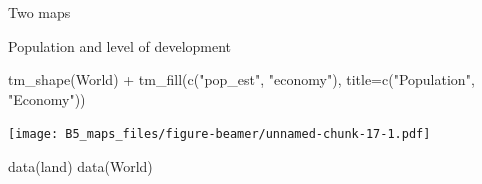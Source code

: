 \documentclass[
  10pt,
  ignorenonframetext,
]{beamer}
\newenvironment{Shaded}{\begin{snugshade}}{\end{snugshade}}
\newcommand{\DataTypeTok}[1]{\textcolor[rgb]{0.87,0.87,0.75}{#1}}
\newcommand{\KeywordTok}[1]{\textcolor[rgb]{0.94,0.87,0.69}{#1}}
\newcommand{\NormalTok}[1]{\textcolor[rgb]{0.80,0.80,0.80}{#1}}
\newcommand{\OperatorTok}[1]{\textcolor[rgb]{0.94,0.94,0.82}{#1}}
\newcommand{\StringTok}[1]{\textcolor[rgb]{0.80,0.58,0.58}{#1}}
\begin{document}
\begin{frame}[fragile]{Two maps}
\protect\hypertarget{two-maps}{}

\begin{block}{Population and level of development}

\begin{Shaded}
\begin{Highlighting}[]
\KeywordTok{tm_shape}\NormalTok{(World) }\OperatorTok{+}\StringTok{ }\KeywordTok{tm_fill}\NormalTok{(}\KeywordTok{c}\NormalTok{(}\StringTok{"pop_est"}\NormalTok{, }\StringTok{"economy"}\NormalTok{), }
        \DataTypeTok{title=}\KeywordTok{c}\NormalTok{(}\StringTok{"Population"}\NormalTok{, }\StringTok{"Economy"}\NormalTok{))}
\end{Highlighting}
\end{Shaded}

\texttt{[image: B5\_maps\_files/figure-beamer/unnamed-chunk-17-1.pdf]}

\begin{Shaded}
\begin{Highlighting}[]
\KeywordTok{data}\NormalTok{(land)}
\KeywordTok{data}\NormalTok{(World)}
\end{Highlighting}
\end{Shaded}


\end{block}
\end{frame}
\end{document}
